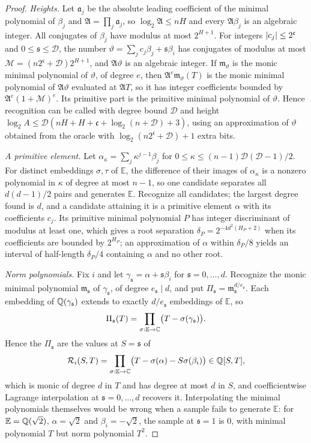 \begin{proof}
\emph{Heights.} Let $\mathfrak a_j$ be the absolute leading coefficient of the
minimal polynomial of $\beta_j$ and $\mathfrak A=\prod_j\mathfrak a_j$, so
$\log_2\mathfrak A\le nH$ and every $\mathfrak A\beta_j$ is an algebraic
integer. All conjugates of $\beta_j$ have modulus at most $2^{H+1}$. For
integers $\left\lvert c_j\right\rvert\le2^{\mathfrak c}$ and $0\le\mathfrak s\le\mathcal D$, the
number $\vartheta=\sum_jc_j\beta_j+\mathfrak s\beta_i$ has conjugates of modulus at
most $\mathcal M=(n2^{\mathfrak c}+\mathcal D)2^{H+1}$, and
$\mathfrak A\vartheta$ is an algebraic integer. If $\mathfrak m_\vartheta$ is the monic
minimal polynomial of $\vartheta$, of degree $e$, then
$\mathfrak A^e\mathfrak m_\vartheta(T)$ is the monic minimal polynomial of
$\mathfrak A\vartheta$ evaluated at $\mathfrak AT$, so it has integer
coefficients bounded by $\mathfrak A^e(1+\mathcal M)^e$. Its primitive part is
the primitive minimal polynomial of $\vartheta$. Hence recognition can be
called with degree bound $\mathcal D$ and height
$\log_2A\le\mathcal D(nH+H+\mathfrak c+\log_2(n+\mathcal D)+3)$, using an
approximation of $\vartheta$ obtained from the oracle with $\log_2(n2^{\mathfrak
c}+\mathcal D)+1$ extra bits.

\emph{A primitive element.} Let $\alpha_\kappa=\sum_j\kappa^{j-1}\beta_j$ for
$0\le\kappa\le(n-1)\mathcal D(\mathcal D-1)/2$. For distinct embeddings
$\sigma,\tau$ of $\mathbb E$, the difference of their images of $\alpha_\kappa$
is a nonzero polynomial in $\kappa$ of degree at most $n-1$, so one candidate
separates all $d(d-1)/2$ pairs and generates $\mathbb E$. Recognize all
candidates; the largest degree found is $d$, and a candidate attaining it is a
primitive element $\alpha$ with its coefficients $c_j$. Its primitive minimal
polynomial $P$ has integer discriminant of modulus at least one, which gives a
root separation $\delta_P=2^{-4d^2(H_P+2)}$ when its coefficients are bounded
by $2^{H_P}$; an approximation of $\alpha$ within $\delta_P/8$ yields an
interval of half-length $\delta_P/4$ containing $\alpha$ and no other root.

\emph{Norm polynomials.} Fix $i$ and let $\gamma_{\mathfrak s}=\alpha+
\mathfrak s\beta_i$ for $\mathfrak s=0,\ldots,d$. Recognize the monic minimal
polynomial $\mathfrak m_{\mathfrak s}$ of $\gamma_{\mathfrak s}$, of degree
$e_{\mathfrak s}\mid d$, and put
$\Pi_{\mathfrak s}=\mathfrak m_{\mathfrak s}^{d/e_{\mathfrak s}}$. Each embedding of $\mathbb Q(\gamma_{\mathfrak s})$ extends to
exactly $d/e_{\mathfrak s}$ embeddings of $\mathbb E$, so
\[
\Pi_{\mathfrak s}(T)=\prod_{\sigma:\mathbb E\to\mathbb C}\bigl(T-\sigma(\gamma_{\mathfrak s})\bigr).
\]
Hence the $\Pi_{\mathfrak s}$ are the values at $S=\mathfrak s$ of
\[
\mathcal R_i(S,T)=\prod_{\sigma:\mathbb E\to\mathbb C}\bigl(T-\sigma(\alpha)-S\sigma(\beta_i)\bigr)
\in\mathbb Q[S,T],
\]
which is monic of degree $d$ in $T$ and has degree at most $d$ in $S$, and
coefficientwise Lagrange interpolation at $\mathfrak s=0,\ldots,d$ recovers it.
Interpolating the minimal polynomials themselves would be wrong when a sample
fails to generate $\mathbb E$: for $\mathbb E=\mathbb Q(\sqrt2)$, $\alpha=\sqrt2$ and
$\beta_i=-\sqrt2$, the sample at $\mathfrak s=1$ is $0$, with minimal polynomial
$T$ but norm polynomial $T^2$.


\end{proof}
